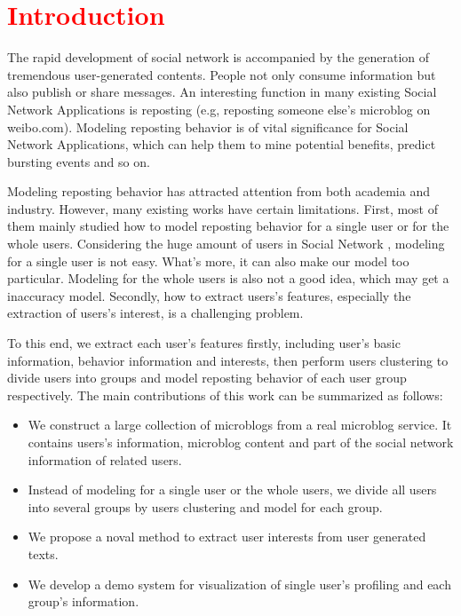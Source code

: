 \section{\textcolor{red}{Introduction}}
\label{sec:intro}

\begin{comment}
\textbf{Motivation}

\textbf{Example}

\textbf{Challenge}

\textbf{Contribution}

\textcolor{blue}{organization of the sections}


\end{comment}


The rapid development of social network is accompanied by the generation of tremendous user-generated contents. People not only consume information but also publish or share messages. An interesting function in many existing Social Network Applications is reposting (e.g, reposting someone else's microblog on weibo.com). Modeling reposting behavior is of vital significance for Social Network Applications, which can help them to mine potential benefits, predict bursting events and so on. \par

Modeling reposting behavior has attracted attention from both academia and industry. However, many existing works have certain limitations. First, most of them mainly studied how to model reposting behavior for a single user or for the whole users. Considering the huge amount of users in Social Network , modeling for a single user is not easy. What's more, it can also make our model too particular. Modeling for the whole users is also not a good idea, which may get a inaccuracy model. Secondly, how to extract users's features, especially the extraction of users's interest, is a challenging problem.\par
To this end, we extract each user's features firstly, including user's basic information, behavior information and interests, then perform users clustering to divide users into groups and model reposting behavior of each user group respectively. The main contributions of this work can be summarized as follows:\par
\begin{itemize}
\item   We construct a large collection of microblogs from a real microblog service. It contains users's information, microblog content and part of the social network information of related users.
\item   Instead of modeling for a single user or the whole users, we divide all users into several groups by users clustering and model for each group.
\item	We propose a noval method to extract user interests from user generated texts.
\item	We develop a demo system for visualization of single user's profiling and each group's information.
\end{itemize}

